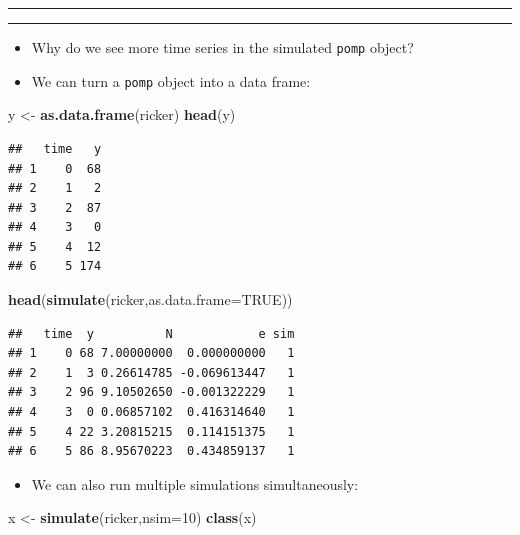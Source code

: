 \documentclass[]{article}
\newenvironment{Shaded}{\begin{snugshade}}{\end{snugshade}}
\newcommand{\KeywordTok}[1]{\textcolor[rgb]{0.13,0.29,0.53}{\textbf{#1}}}
\newcommand{\DataTypeTok}[1]{\textcolor[rgb]{0.13,0.29,0.53}{#1}}
\newcommand{\DecValTok}[1]{\textcolor[rgb]{0.00,0.00,0.81}{#1}}
\newcommand{\StringTok}[1]{\textcolor[rgb]{0.31,0.60,0.02}{#1}}
\newcommand{\OtherTok}[1]{\textcolor[rgb]{0.56,0.35,0.01}{#1}}
\newcommand{\NormalTok}[1]{#1}
\providecommand{\tightlist}{%
  \setlength{\itemsep}{0pt}\setlength{\parskip}{0pt}}
\begin{document}
\begin{center}\rule{0.5\linewidth}{\linethickness}\end{center}

\begin{center}\rule{0.5\linewidth}{\linethickness}\end{center}

\begin{itemize}
\item
  Why do we see more time series in the simulated \texttt{pomp} object?
\item
  We can turn a \texttt{pomp} object into a data frame:
\end{itemize}

\begin{Shaded}
\begin{Highlighting}[]
\NormalTok{y <-}\StringTok{ }\KeywordTok{as.data.frame}\NormalTok{(ricker)}
\KeywordTok{head}\NormalTok{(y)}
\end{Highlighting}
\end{Shaded}

\begin{verbatim}
##   time   y
## 1    0  68
## 2    1   2
## 3    2  87
## 4    3   0
## 5    4  12
## 6    5 174
\end{verbatim}

\begin{Shaded}
\begin{Highlighting}[]
\KeywordTok{head}\NormalTok{(}\KeywordTok{simulate}\NormalTok{(ricker,}\DataTypeTok{as.data.frame=}\OtherTok{TRUE}\NormalTok{))}
\end{Highlighting}
\end{Shaded}

\begin{verbatim}
##   time  y          N            e sim
## 1    0 68 7.00000000  0.000000000   1
## 2    1  3 0.26614785 -0.069613447   1
## 3    2 96 9.10502650 -0.001322229   1
## 4    3  0 0.06857102  0.416314640   1
## 5    4 22 3.20815215  0.114151375   1
## 6    5 86 8.95670223  0.434859137   1
\end{verbatim}

\begin{itemize}
\tightlist
\item
  We can also run multiple simulations simultaneously:
\end{itemize}

\begin{Shaded}
\begin{Highlighting}[]
\NormalTok{x <-}\StringTok{ }\KeywordTok{simulate}\NormalTok{(ricker,}\DataTypeTok{nsim=}\DecValTok{10}\NormalTok{)}
\KeywordTok{class}\NormalTok{(x)}
\end{Highlighting}
\end{Shaded}
\end{document}
